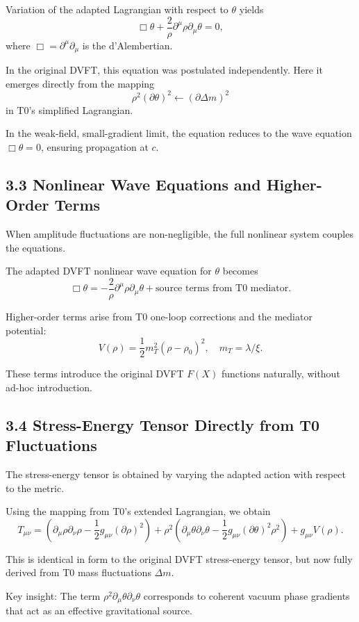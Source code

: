 \documentclass[12pt,a4paper]{article}
\begin{document}
	Variation of the adapted Lagrangian with respect to $\theta$ yields
	\[
	\Box \theta + \frac{2}{\rho} \partial^\mu \rho \partial_\mu \theta = 0,
	\]
	where $\Box = \partial^\mu \partial_\mu$ is the d'Alembertian.
	
	In the original DVFT, this equation was postulated independently. Here it emerges directly from the mapping
	\[
	\rho^2 (\partial \theta)^2 \leftarrow (\partial \Delta m)^2
	\]
	in T0's simplified Lagrangian.
	
	In the weak-field, small-gradient limit, the equation reduces to the wave equation $\Box \theta = 0$, ensuring propagation at $c$.
	
	\subsection{3.3 Nonlinear Wave Equations and Higher-Order Terms}
	
	When amplitude fluctuations are non-negligible, the full nonlinear system couples the equations.
	
	The adapted DVFT nonlinear wave equation for $\theta$ becomes
	\[
	\Box \theta = -\frac{2}{\rho} \partial^\mu \rho \partial_\mu \theta + \text{source terms from T0 mediator}.
	\]
	
	Higher-order terms arise from T0 one-loop corrections and the mediator potential:
	\[
	V(\rho) = \frac{1}{2} m_T^2 (\rho - \rho_0)^2, \quad m_T = \lambda / \xi.
	\]
	
	These terms introduce the original DVFT $F(X)$ functions naturally, without ad-hoc introduction.
	
	\subsection{3.4 Stress-Energy Tensor Directly from T0 Fluctuations}
	
	The stress-energy tensor is obtained by varying the adapted action with respect to the metric.
	
	Using the mapping from T0's extended Lagrangian, we obtain
	\[
	T_{\mu\nu} = (\partial_\mu \rho \partial_\nu \rho - \frac{1}{2} g_{\mu\nu} (\partial \rho)^2) + \rho^2 (\partial_\mu \theta \partial_\nu \theta - \frac{1}{2} g_{\mu\nu} (\partial \theta)^2 \rho^2) + g_{\mu\nu} V(\rho).
	\]
	
	This is identical in form to the original DVFT stress-energy tensor, but now fully derived from T0 mass fluctuations $\Delta m$.
	
	Key insight: The term $\rho^2 \partial_\mu \theta \partial_\nu \theta$ corresponds to coherent vacuum phase gradients that act as an effective gravitational source.
	
\end{document}
